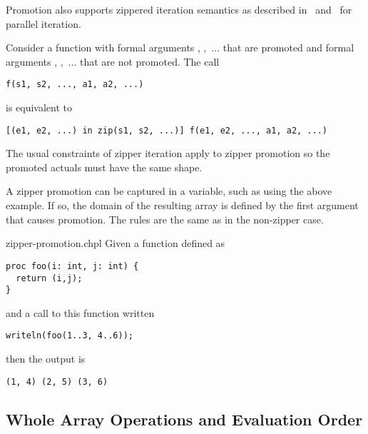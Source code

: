 Promotion also supports zippered iteration semantics as described
in~ and~ for parallel
iteration.

Consider a function  with formal
arguments , ,~... that are promoted and formal
arguments , ,~... that are not promoted.  The call
\begin{chapel}
\begin{verbatim}
f(s1, s2, ..., a1, a2, ...)
\end{verbatim}
\end{chapel}
is equivalent to
\begin{chapel}
\begin{verbatim}
[(e1, e2, ...) in zip(s1, s2, ...)] f(e1, e2, ..., a1, a2, ...)
\end{verbatim}
\end{chapel}
The usual constraints of zipper iteration apply to zipper promotion so
the promoted actuals must have the same shape.

A zipper promotion can be captured in a variable, such as
 using the above example.
If so, the domain of the resulting array is defined by the first argument
that causes promotion. The rules are the same as in the non-zipper case.


\begin{chapelexample}{zipper-promotion.chpl}
Given a function defined as
\begin{chapel}
\begin{verbatim}
proc foo(i: int, j: int) {
  return (i,j);
}
\end{verbatim}
\end{chapel}
and a call to this function written
\begin{chapel}
\begin{verbatim}
writeln(foo(1..3, 4..6));
\end{verbatim}
\end{chapel}
then the output is
\begin{chapelprintoutput}
\begin{verbatim}
(1, 4) (2, 5) (3, 6)
\end{verbatim}
\end{chapelprintoutput}
\end{chapelexample}


\subsection{Whole Array Operations and Evaluation Order}
\label{Whole_Array_Operations}

